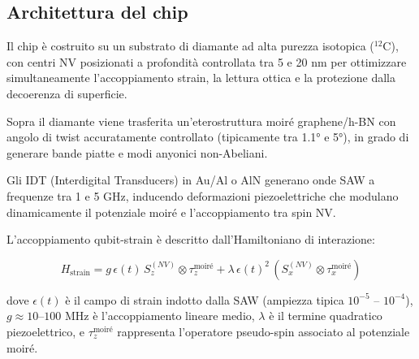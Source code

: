 \documentclass[11pt,a4paper]{article}
\theoremstyle{plain}
\theoremstyle{definition}
\begin{document}
\subsection{Architettura del chip}

\vspace{0.2cm}

Il chip è costruito su un substrato di diamante ad alta purezza isotopica (${}^{12}$C), con centri NV posizionati a profondità controllata tra 5 e 20 nm per ottimizzare simultaneamente l’accoppiamento strain, la lettura ottica e la protezione dalla decoerenza di superficie. 

\vspace{0.5cm}


Sopra il diamante viene trasferita un’eterostruttura moiré graphene/h-BN con angolo di twist accuratamente controllato (tipicamente tra 1.1° e 5°), in grado di generare bande piatte e modi anyonici non-Abeliani. 


\vspace{0.5cm}



Gli IDT (Interdigital Transducers) in Au/Al o AlN generano onde SAW a frequenze tra 1 e 5 GHz, inducendo deformazioni piezoelettriche che modulano dinamicamente il potenziale moiré e l’accoppiamento tra spin NV.


\vspace{0.3cm}

L’accoppiamento qubit-strain è descritto dall’Hamiltoniano di interazione:

\vspace{0.3cm}

\begin{tcolorbox}[colback=blue!5!white, colframe=blue!75!black, title={Hamiltoniano di accoppiamento strain-mediated}]
\begin{equation}
H_{\text{strain}} = g \, \epsilon(t) \, S_z^{(NV)} \otimes \tau_z^{\text{moiré}} + \lambda \, \epsilon(t)^2 \, (S_x^{(NV)} \otimes \tau_x^{\text{moiré}})
\label{eq:strain_hamiltonian}
\end{equation}
\end{tcolorbox}


\vspace{0.5cm}

dove $\epsilon(t)$ è il campo di strain indotto dalla SAW (ampiezza tipica $10^{-5}$ – $10^{-4}$), $g \approx 10$–$100$ MHz è l’accoppiamento lineare medio, $\lambda$ è il termine quadratico piezoelettrico, e $\tau_z^{\text{moiré}}$ rappresenta l’operatore pseudo-spin associato al potenziale moiré.
\end{document}

